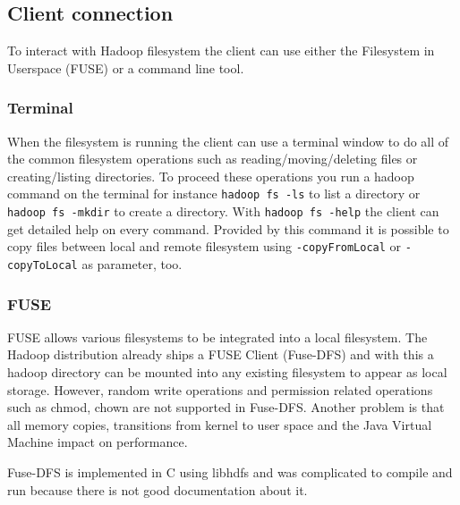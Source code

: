 \subsection{Client connection}
\label{sec:hdfs_client}

To interact with Hadoop filesystem the client can use either the Filesystem in Userspace (FUSE) or a command line tool.

\subsubsection{Terminal}

When the filesystem is running the client can use a terminal window to do all of the common filesystem operations such as reading/moving/deleting files or creating/listing directories. To proceed these operations you run a hadoop command on the terminal for instance \texttt{hadoop fs -ls} to list a directory or \texttt{hadoop fs -mkdir} to create a directory. With \texttt{hadoop fs -help} the client can get detailed help on every command. 
Provided by this command it is possible to copy files between local and remote filesystem using \texttt{-copyFromLocal} or \texttt{-copyToLocal} as parameter, too.

\subsubsection{FUSE}

FUSE allows various filesystems to be integrated into a local filesystem. The Hadoop distribution already ships a FUSE Client (Fuse-DFS) and with this a hadoop directory can be mounted into any existing filesystem to appear as local storage.
However, random write operations and permission related operations such as chmod, chown are not supported in Fuse-DFS. Another problem is that all memory copies, transitions from kernel to user space and the Java Virtual Machine impact on performance.

Fuse-DFS is implemented in C using libhdfs and was complicated to compile and run because there is not good documentation about it.
